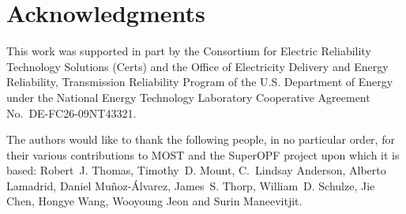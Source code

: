 \documentclass[12pt]{article}
\newcommand{\most}[0]{{MOST}}
\newcommand{\certs}[0]{{\sc Certs}}
\newcommand{\CERTS}[0]{{Consortium for Electric Reliability Technology Solutions (\certs{})}}
\numberwithin{equation}{section}
\numberwithin{table}{section}
\numberwithin{figure}{section}
\begin{document}
\clearpage
\section{Acknowledgments}

This work was supported in part by the \CERTS{} and the Office of Electricity Delivery and Energy Reliability, Transmission Reliability Program of the U.S. Department of Energy under the National Energy Technology Laboratory Cooperative Agreement No.~DE-FC26-09NT43321.

The authors would like to thank the following people, in no particular order, for their various contributions to \most{} and the SuperOPF project upon which it is based: Robert~J. Thomas, Timothy~D. Mount, C.~Lindsay Anderson, Alberto Lamadrid, Daniel Mu\~noz-\'Alvarez, James~S. Thorp, William~D. Schulze, Jie Chen, Hongye Wang, Wooyoung Jeon and Surin Maneevitjit.

\end{document}
